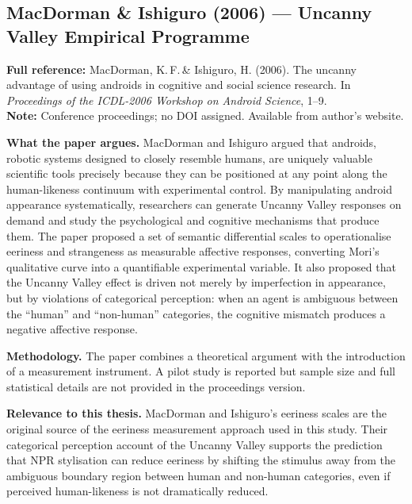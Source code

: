 \documentclass[11pt, a4paper]{article}
\begin{document}
\subsection{MacDorman \& Ishiguro (2006) --- Uncanny Valley Empirical Programme}

\begin{infobox}
\small
\textbf{Full reference:} MacDorman, K.\,F.\,\& Ishiguro, H. (2006). The uncanny advantage of using androids in cognitive and social science research. In \textit{Proceedings of the ICDL-2006 Workshop on Android Science}, 1--9.\\[4pt]
\textbf{Note:} Conference proceedings; no DOI assigned. Available from author's website.
\end{infobox}

\textbf{What the paper argues.} MacDorman and Ishiguro argued that androids, robotic systems designed to closely resemble humans, are uniquely valuable scientific tools precisely because they can be positioned at any point along the human-likeness continuum with experimental control. By manipulating android appearance systematically, researchers can generate Uncanny Valley responses on demand and study the psychological and cognitive mechanisms that produce them. The paper proposed a set of semantic differential scales to operationalise eeriness and strangeness as measurable affective responses, converting Mori's qualitative curve into a quantifiable experimental variable. It also proposed that the Uncanny Valley effect is driven not merely by imperfection in appearance, but by violations of categorical perception: when an agent is ambiguous between the ``human'' and ``non-human'' categories, the cognitive mismatch produces a negative affective response.

\textbf{Methodology.} The paper combines a theoretical argument with the introduction of a measurement instrument. A pilot study is reported but sample size and full statistical details are not provided in the proceedings version.

\textbf{Relevance to this thesis.} MacDorman and Ishiguro's eeriness scales are the original source of the eeriness measurement approach used in this study. Their categorical perception account of the Uncanny Valley supports the prediction that NPR stylisation can reduce eeriness by shifting the stimulus away from the ambiguous boundary region between human and non-human categories, even if perceived human-likeness is not dramatically reduced.
\end{document}
